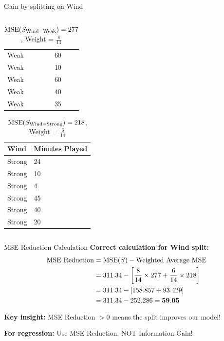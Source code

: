 \documentclass[usenames,dvipsnames]{beamer}
\begin{document}
\begin{frame}{Gain by splitting on Wind}
\begin{columns}
\begin{column}{.5\textwidth}
\begin{tiny}
\begin{table}[]
\begin{tabular}{@{}ll@{}}
		Weak          & 60                      \\
		Weak          & 10                      \\
		Weak          & 60                      \\
		Weak          & 40                      \\
		Weak          & 35                      \\ \bottomrule
	\end{tabular}
\caption{$\operatorname{MSE}(S_{\text{Wind=Weak}}) = 277$, Weight = $\frac{8}{14}$}
\end{table}
\vspace{-25pt}
	\end{tiny}

	\begin{tiny}
	
	\begin{table}[]
		\begin{tabular}{@{}ll@{}}
			\toprule
			\textbf{Wind} & \textbf{Minutes Played} \\ \midrule

			Strong        & 24                      \\
			Strong        & 10                      \\
			Strong        & 4                       \\
			Strong        & 45                      \\
			Strong        & 40                      \\
			Strong        & 20                      \\ \bottomrule
		\end{tabular}
\caption{$\operatorname{MSE}(S_{\text{Wind=Strong}}) = 218$, Weight = $\frac{6}{14}$}
	\end{table}
\end{tiny}

\end{column}
\end{columns}
\end{frame}

\begin{frame}{MSE Reduction Calculation}
\textbf{Correct calculation for Wind split:}
\begin{align}
\text{MSE Reduction} &= \operatorname{MSE}(S) - \text{Weighted Average MSE} \\
&= 311.34 - \left[\frac{8}{14} \times 277 + \frac{6}{14} \times 218\right] \\
&= 311.34 - [158.857 + 93.429] \\
&= 311.34 - 252.286 = \mathbf{59.05}
\end{align}

\textbf{Key insight:} MSE Reduction $> 0$ means the split improves our model!

\textbf{For regression:} Use MSE Reduction, NOT Information Gain!
\end{frame}
\end{document}
